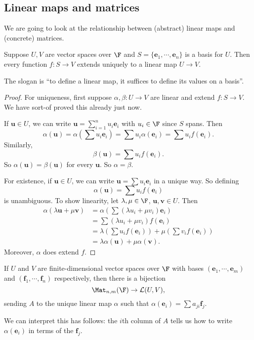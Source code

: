 \documentclass[a4paper]{article}
\begin{document}
\subsection{Linear maps and matrices}
We are going to look at the relationship between (abstract) linear maps and (concrete) matrices.
\begin{prop}
  Suppose $U, V$ are vector spaces over $\F$ and $S = \{\mathbf{e}_1, \cdots, \mathbf{e}_n\}$ is a basis for $U$. Then every function $f: S \to V$ extends uniquely to a linear map $U \to V$.
\end{prop}
The slogan is ``to define a linear map, it suffices to define its values on a basis''.

\begin{proof}
  For uniqueness, first suppose $\alpha, \beta: U \to V$ are linear and extend $f: S \to V$. We have sort-of proved this already just now.

  If $\mathbf{u}\in U$, we can write $\mathbf{u} = \sum_{i = 1}^n u_i \mathbf{e}_i$ with $u_i \in \F$ since $S$ spans. Then
  \[
    \alpha (\mathbf{u}) = \alpha\left(\sum u_i \mathbf{e}_i\right) = \sum u_i \alpha (\mathbf{e}_i) = \sum u_i f( \mathbf{e}_i).
  \]
  Similarly,
  \[
    \beta( \mathbf{u}) = \sum u_i f(\mathbf{e}_i).
  \]
  So $\alpha (\mathbf{u}) = \beta(\mathbf{u})$ for every $\mathbf{u}$. So $\alpha = \beta$.

  For existence, if $\mathbf{u} \in U$, we can write $\mathbf{u} = \sum u_i \mathbf{e}_i$ in a unique way. So defining
  \[
    \alpha(\mathbf{u}) = \sum u_i f(\mathbf{e}_i)
  \]
  is unambiguous. To show linearity, let $\lambda, \mu\in \F$, $\mathbf{u}, \mathbf{v}\in U$. Then
  \begin{align*}
    \alpha (\lambda \mathbf{u} + \mu \mathbf{v}) &= \alpha \left(\sum (\lambda u_i + \mu v_i) \mathbf{e}_i\right) \\
    &= \sum (\lambda u_i + \mu v_i) f(\mathbf{e}_i)\\
    &= \lambda \left(\sum u_i f(\mathbf{e}_i)\right) + \mu \left(\sum v_i f(\mathbf{e}_i)\right)\\
    &= \lambda \alpha(\mathbf{u}) + \mu \alpha(\mathbf{v}).
  \end{align*}
  Moreover, $\alpha$ does extend $f$.
\end{proof}

\begin{cor}
  If $U$ and $V$ are finite-dimensional vector spaces over $\F$ with bases $(\mathbf{e}_1, \cdots, \mathbf{e}_m)$ and $(\mathbf{f}_1, \cdots, \mathbf{f}_n)$ respectively, then there is a bijection
  \[
    \Mat_{n, m}(\F) \to \mathcal{L}(U, V),
  \]
  sending $A$ to the unique linear map $\alpha$ such that $\alpha(\mathbf{e}_i) =  \sum a_{ji} \mathbf{f}_j$.
\end{cor}
We can interpret this has follows: the $i$th column of $A$ tells us how to write $\alpha (\mathbf{e}_i)$ in terms of the $\mathbf{f}_j$.
\end{document}
